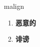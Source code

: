 
\begin{frame}
{\huge malign}
\begin{center}
\begin{enumerate}\Large
  \item \textbf{恶意的}
  \item \textbf{诽谤}
\end{enumerate}
\end{center}
\end{frame}
